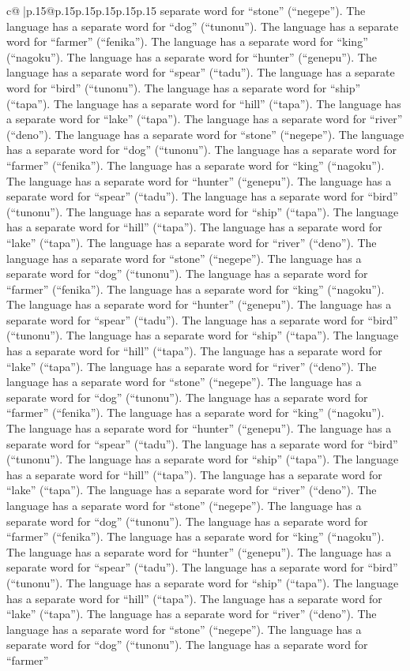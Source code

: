 \documentclass{article}
\begin{document}
{\begin{supertabular}{c@{$\;$}|p{.15\linewidth}@{}p{.15\linewidth}p{.15\linewidth}p{.15\linewidth}p{.15\linewidth}p{.15\linewidth}}
{{{separate word for “stone” (“negepe”). The language has a separate word for “dog” (“tunonu”). The language has a separate word for “farmer” (“fenika”). The language has a separate word for “king” (“nagoku”). The language has a separate word for “hunter” (“genepu”). The language has a separate word for “spear” (“tadu”). The language has a separate word for “bird” (“tunonu”). The language has a separate word for “ship” (“tapa”). The language has a separate word for “hill” (“tapa”). The language has a separate word for “lake” (“tapa”). The language has a separate word for “river” (“deno”). The language has a separate word for “stone” (“negepe”). The language has a separate word for “dog” (“tunonu”). The language has a separate word for “farmer” (“fenika”). The language has a separate word for “king” (“nagoku”). The language has a separate word for “hunter” (“genepu”). The language has a separate word for “spear” (“tadu”). The language has a separate word for “bird” (“tunonu”). The language has a separate word for “ship” (“tapa”). The language has a separate word for “hill” (“tapa”). The language has a separate word for “lake” (“tapa”). The language has a separate word for “river” (“deno”). The language has a separate word for “stone” (“negepe”). The language has a separate word for “dog” (“tunonu”). The language has a separate word for “farmer” (“fenika”). The language has a separate word for “king” (“nagoku”). The language has a separate word for “hunter” (“genepu”). The language has a separate word for “spear” (“tadu”). The language has a separate word for “bird” (“tunonu”). The language has a separate word for “ship” (“tapa”). The language has a separate word for “hill” (“tapa”). The language has a separate word for “lake” (“tapa”). The language has a separate word for “river” (“deno”). The language has a separate word for “stone” (“negepe”). The language has a separate word for “dog” (“tunonu”). The language has a separate word for “farmer” (“fenika”). The language has a separate word for “king” (“nagoku”). The language has a separate word for “hunter” (“genepu”). The language has a separate word for “spear” (“tadu”). The language has a separate word for “bird” (“tunonu”). The language has a separate word for “ship” (“tapa”). The language has a separate word for “hill” (“tapa”). The language has a separate word for “lake” (“tapa”). The language has a separate word for “river” (“deno”). The language has a separate word for “stone” (“negepe”). The language has a separate word for “dog” (“tunonu”). The language has a separate word for “farmer” (“fenika”). The language has a separate word for “king” (“nagoku”). The language has a separate word for “hunter” (“genepu”). The language has a separate word for “spear” (“tadu”). The language has a separate word for “bird” (“tunonu”). The language has a separate word for “ship” (“tapa”). The language has a separate word for “hill” (“tapa”). The language has a separate word for “lake” (“tapa”). The language has a separate word for “river” (“deno”). The language has a separate word for “stone” (“negepe”). The language has a separate word for “dog” (“tunonu”). The language has a separate word for “farmer” }}}
\end{supertabular}}
\end{document}
